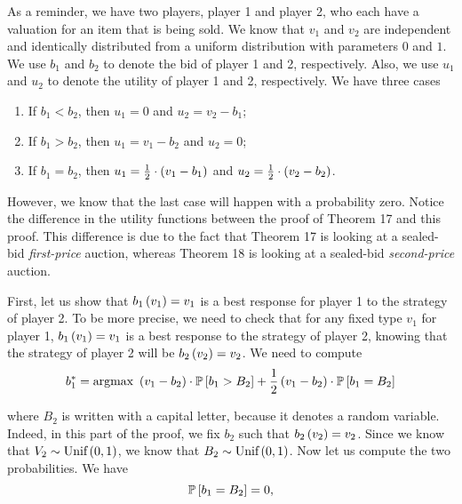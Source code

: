 As a reminder, we have two players, player 1 and player 2, who each have a valuation for an item that is being sold. We know that $v_1$ and $v_2$ are independent and identically distributed from a uniform distribution with parameters $0$ and $1$. We use $b_1$ and $b_2$ to denote the bid of player 1 and 2, respectively. Also, we use $u_1$ and $u_2$ to denote the utility of player 1 and 2, respectively. We have three cases
\begin{enumerate}
    \item If $b_1 < b_2$, then $u_1 = 0$ and $u_2 = v_2 - b_1$;
    \item If $b_1 > b_2$, then $u_1 = v_1 - b_2$ and $u_2 = 0$;
    \item If $b_1 = b_2$, then $u_1 = \frac{1}{2} \cdot \parent{v_1 - b_1}$ and $u_2 = \frac{1}{2} \cdot \parent{v_2 - b_2}$.
\end{enumerate}

However, we know that the last case will happen with a probability zero.
Notice the difference in the utility functions between the proof of Theorem 17 and this proof. This difference is due to the fact that Theorem 17 is looking at a sealed-bid \textit{first-price} auction, whereas Theorem 18 is looking at a sealed-bid \textit{second-price} auction.

\vspace{5mm}


First, let us show that $b_1 \parent{v_1} = v_1$ is a best response for player 1 to the strategy of player 2. To be more precise, we need to check that for any fixed type $v_1$ for player 1, $b_1 \parent{v_1} = v_1$ is a best response to the strategy of player 2, knowing that the strategy of player 2 will be $b_2 \parent{v_2} = v_2$.
We need to compute
\begin{equation*}
    b_1^{*}
    = \text{argmax} \
    \parent{v_1 - b_2} \cdot \mathbb{P} \squared{b_1 > B_2}
    + \dfrac{1}{2} \parent{v_1 - b_2} \cdot \mathbb{P} \squared{b_1 = B_2}
\end{equation*}

where $B_2$ is written with a capital letter, because it denotes a random variable. Indeed, in this part of the proof, we fix $b_2$ such that $b_2 \parent{v_2} = v_2$. Since we know that $V_2 \sim \text{Unif} \parent{0, 1}$, we know that $B_2 \sim \text{Unif} \parent{0, 1}$. Now let us compute the two probabilities. We have
\begin{equation*}
    \mathbb{P} \squared{b_1 = B_2}
    = 0,
\end{equation*}

